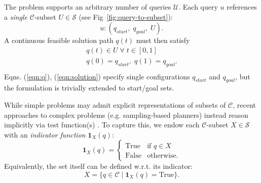 The problem supports an arbitrary number of queries $\mathcal{U}$.
Each query $u$ references a \emph{single}
$\mathcal{C}$-subset $U \in \mathcal{S}$
(see Fig~\ref{fig:query-to-subset}):
\begin{equation}
  u : ( q_{start},\; q_{goal},\; U ) .
  \label{eqn:q}
\end{equation}
A continuous feasible solution path $q(t)$ must then satisfy
\begin{equation}
  \begin{array}{c}
  q(t) \in U \;\forall\; t \in [0,1] \\
  q(0) = q_{start},\; q(1) = q_{goal} . \\
  \end{array}
  \label{eqn:solution}
\end{equation}
Eqns. (\ref{eqn:q}), (\ref{eqn:solution})
specify single configurations
$q_{start}$ and $q_{goal}$,
but the formulation is trivially extended to start/goal sets.

While simple problems may admit explicit representations of
subsets of $\mathcal{C}$,
recent approaches to complex problems
(e.g. sampling-based planners)
instead reason implicitly via test function(s)
\citep{lavalle2006planningbook}.
To capture this,
we endow each $\mathcal{C}$-subset $X \in \mathcal{S}$ with an
\emph{indicator function} $\mathbf{1}_X(q)$:
\begin{equation}
  \mathbf{1}_X(q) =
    \left\{ \begin{array}{ll}
      \mbox{True} & \mbox{if } q \in X \\
      \mbox{False} & \mbox{otherwise}.
    \end{array} \right.
  \label{eqn:indicator-function}
\end{equation}
Equivalently, the set itself can be defined w.r.t. its indicator:
\begin{equation}
  X = \{ q \in \mathcal{C} \;|\; \mathbf{1}_X(q) = \mbox{True} \} .
\end{equation}

